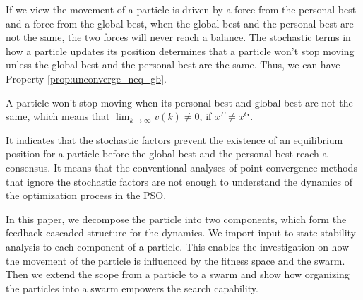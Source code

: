 If we view the movement of a particle is driven by a force from the personal best and a force from the global best, when the global best and the personal best are not the same, the two forces will never reach a balance.
The stochastic terms in how a particle updates its position determines that a particle won't stop moving unless the global best and the personal best are the same.
Thus, we can have Property \ref{prop:unconverge_neq_gb}.
\begin{myprop}
\label{prop:unconverge_neq_gb}
A particle won't stop moving when its personal best and global best are not the same, 
which means that 
$ \lim_{k \rightarrow \infty} v(k) \neq 0 $, if $ x^{P} \neq x^{G} $.
\end{myprop}
It indicates that the stochastic factors prevent the existence of an equilibrium position for a particle before the global best and the personal best reach a consensus.
It means that the conventional analyses of point convergence methods that ignore the stochastic factors are not enough to understand the dynamics of the optimization process in the PSO.

In this paper, we decompose the particle into two components, which form the feedback cascaded structure for the dynamics.
We import input-to-state stability analysis to each component of a particle.
This enables the investigation on how the movement of the particle is influenced by the fitness space and the swarm.
Then we extend the scope from a particle to a swarm and show how organizing the particles into a swarm empowers the search capability.
